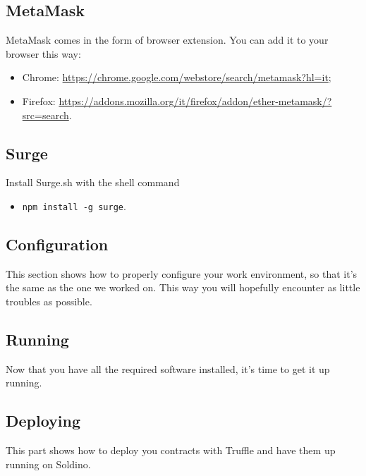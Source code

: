 \subsection{MetaMask}
MetaMask comes in the form of browser extension. You can add it to your browser this way:
\begin{itemize}
	\item Chrome:  \href{https://chrome.google.com/webstore/search/metamask?hl=it}{https://chrome.google.com/webstore/search/metamask?hl=it};
	\item Firefox: \href{https://addons.mozilla.org/it/firefox/addon/ether-metamask/?src=search}{https://addons.mozilla.org/it/firefox/addon/ether-metamask/?src=search}.
\end{itemize}

\subsection{Surge}
Install Surge.sh with the shell command
\begin{itemize}
	\item[]\texttt{npm install -g surge}.
\end{itemize}


\subsection{Configuration}
This section shows how to properly configure your work environment, so that it's the same as the one we worked on. 
This way you will hopefully encounter as little troubles as possible.\\


\subsection{Running}
Now that you have all the required software installed, it's time to get it up running.\\


\subsection{Deploying}
This part shows how to deploy you contracts with Truffle and have them up running on Soldino.
